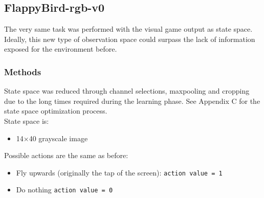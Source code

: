 \documentclass[11pt,a4paper,twocolumn]{IEEEtran}
\begin{document}
		\subsection{\textbf{FlappyBird-rgb-v0}}
			The very same task was performed with the visual game output as state space.\\ Ideally, this new type of observation space could surpass the lack of information exposed for the environment before.
			
			\subsubsection{\textbf{Methods}}
			State space was reduced through channel selections, maxpooling and cropping due to the long times required during the learning phase. See Appendix C for the state space optimization process.\\
			State space is:
			\begin{itemize}
				\item 14$\times$40 grayscale image
			\end{itemize}
			Possible actions are the same as before:
			\begin{itemize}
				\item Fly upwards (originally the tap of the screen): \texttt{action value = 1}
				\item Do nothing \texttt{action value = 0}
			\end{itemize}\vspace{.5cm}
			
\end{document}
